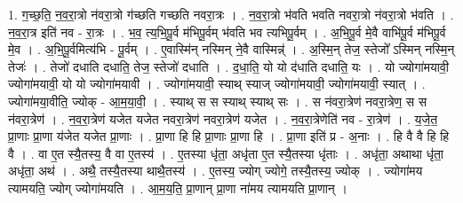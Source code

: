 \documentclass[17pt]{extarticle}
\begin{document}
1. ग॒च्छ॒ति॒ न॒व॒रा॒त्रो न॑वरा॒त्रो ग॑च्छति गच्छति नवरा॒त्रः । . न॒व॒रा॒त्रो भ॑वति भवति नवरा॒त्रो न॑वरा॒त्रो भ॑वति । . न॒व॒रा॒त्र इति॑ नव - रा॒त्रः । . भ॒व॒ त्य॒भि॒पू॒र्व म॑भिपू॒र्वम् भ॑वति भव त्यभिपू॒र्वम् । . अ॒भि॒पू॒र्व मे॒वै वाभि॑पू॒र्व म॑भिपू॒र्व मे॒व । . अ॒भि॒पू॒र्वमित्य॑भि - पू॒र्वम् । . ए॒वास्मि॑न् नस्मिन् ने॒वै वास्मिन्न्॑ । . अ॒स्मि॒न् तेज॒ स्तेजो᳚ ऽस्मिन् नस्मि॒न् तेजः॑ । . तेजो॑ दधाति दधाति॒ तेज॒ स्तेजो॑ दधाति । . द॒धा॒ति॒ यो यो द॑धाति दधाति॒ यः । . यो ज्योगा॑मयावी॒ ज्योगा॑मयावी॒ यो यो ज्योगा॑मयावी । . ज्योगा॑मयावी॒ स्याथ् स्याज् ज्योगा॑मयावी॒ ज्योगा॑मयावी॒ स्यात् । . ज्योगा॑मया॒वीति॒ ज्योक् - आ॒म॒या॒वी॒ । . स्याथ् स स स्याथ् स्याथ् सः । . स न॑वरा॒त्रेण॑ नवरा॒त्रेण॒ स स न॑वरा॒त्रेण॑ । . न॒व॒रा॒त्रेण॑ यजेत यजेत नवरा॒त्रेण॑ नवरा॒त्रेण॑ यजेत । . न॒व॒रा॒त्रेणेति॑ नव - रा॒त्रेण॑ । . य॒जे॒त॒ प्रा॒णाः प्रा॒णा य॑जेत यजेत प्रा॒णाः । . प्रा॒णा हि हि प्रा॒णाः प्रा॒णा हि । . प्रा॒णा इति॑ प्र - अ॒नाः । . हि वै वै हि हि वै । . वा ए॒त स्यै॒तस्य॒ वै वा ए॒तस्य॑ । . ए॒तस्या धृ॑ता॒ अधृ॑ता ए॒त स्यै॒तस्या धृ॑ताः । . अधृ॑ता॒ अथाथा धृ॑ता॒ अधृ॑ता॒ अथ॑ । . अथै॒ तस्यै॒तस्या थाथै॒तस्य॑ । . ए॒तस्य॒ ज्योग् ज्योगे॒ तस्यै॒तस्य॒ ज्योक् । . ज्योगा॑मय त्यामयति॒ ज्योग् ज्योगा॑मयति । . आ॒म॒य॒ति॒ प्रा॒णान् प्रा॒णा ना॑मय त्यामयति प्रा॒णान् । \newline
\end{document}
